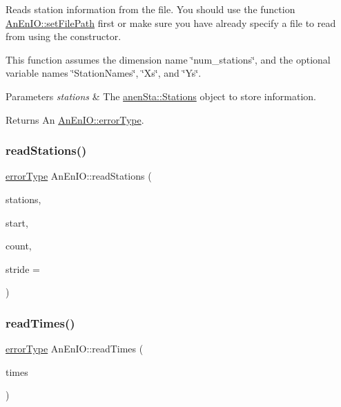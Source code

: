 Reads station information from the file. You should use the function \mbox{\hyperlink{class_an_en_i_o_a98066d375cc78694fda2af1ce37cc8d8}{An\+En\+I\+O\+::set\+File\+Path}} first or make sure you have already specify a file to read from using the constructor.

This function assumes the dimension name \char`\"{}num\+\_\+stations\char`\"{}, and the optional variable names \char`\"{}\+Station\+Names\char`\"{}, \char`\"{}\+Xs\char`\"{}, and \char`\"{}\+Ys\char`\"{}.


\begin{DoxyParams}{Parameters}
{\em stations} & The \mbox{\hyperlink{classanen_sta_1_1_stations}{anen\+Sta\+::\+Stations}} object to store information. \\
\hline
\end{DoxyParams}
\begin{DoxyReturn}{Returns}
An \mbox{\hyperlink{class_an_en_i_o_aa56bc1ec6610b86db4349bce20f9ead0}{An\+En\+I\+O\+::error\+Type}}. 
\end{DoxyReturn}
\mbox{\label{class_an_en_i_o_ad0f7a1db44e12f42d4602898c0f51faa}} 
\subsubsection{\texorpdfstring{read\+Stations()}{readStations()}\hspace{0.1cm}{\footnotesize\ttfamily [2/2]}}
{\footnotesize\ttfamily \mbox{\hyperlink{class_an_en_i_o_aa56bc1ec6610b86db4349bce20f9ead0}{error\+Type}} An\+En\+I\+O\+::read\+Stations (\begin{DoxyParamCaption}\item[{\mbox{\hyperlink{classanen_sta_1_1_stations}{anen\+Sta\+::\+Stations}} \&}]{stations,  }\item[{size\+\_\+t}]{start,  }\item[{size\+\_\+t}]{count,  }\item[{ptrdiff\+\_\+t}]{stride = {} }\end{DoxyParamCaption})}

\mbox{\label{class_an_en_i_o_a19b454b0a9ecb5ecbc2cc2a9c139770b}} 
\subsubsection{\texorpdfstring{read\+Times()}{readTimes()}\hspace{0.1cm}{\footnotesize\ttfamily [1/2]}}
{\footnotesize\ttfamily \mbox{\hyperlink{class_an_en_i_o_aa56bc1ec6610b86db4349bce20f9ead0}{error\+Type}} An\+En\+I\+O\+::read\+Times (\begin{DoxyParamCaption}\item[{\mbox{\hyperlink{classanen_time_1_1_times}{anen\+Time\+::\+Times}} \&}]{times }\end{DoxyParamCaption})}

